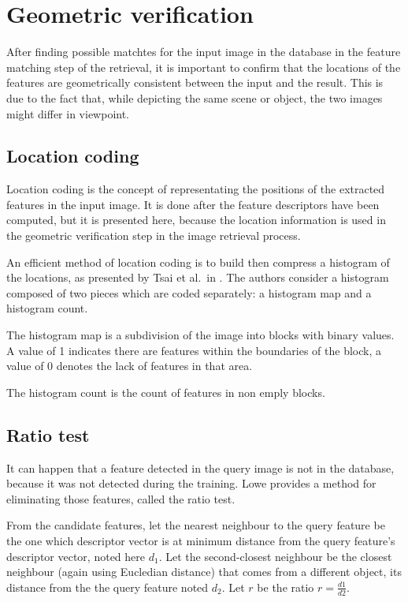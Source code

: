 \section{Geometric verification}
\label{sec:geometric_verification}

After finding possible matchtes for the input image in the database in the feature matching step of the retrieval, it is important to confirm that the locations of the features are geometrically consistent between the input and the result. This is due to the fact that, while depicting the same scene or object, the two images might differ in viewpoint.

\subsection{Location coding}

Location coding is the concept of representating the positions of the extracted features in the input image. It is done after the feature descriptors have been computed, but it is presented here, because the location information is used in the geometric verification step in the image retrieval process.

An efficient method of location coding is to build then compress a histogram of the locations, as presented by Tsai et al.\ in \cite{tsai2010fast}. The authors consider a histogram composed of two pieces which are coded separately: a histogram map and a histogram count.

The histogram map is a subdivision of the image into blocks with binary values. A value of 1 indicates there are features within the boundaries of the block, a value of 0 denotes the lack of features in that area.

The histogram count is the count of features in non emply blocks.

\subsection{Ratio test}

It can happen that a feature detected in the query image is not in the database, because it was not detected during the training. Lowe \cite{Lowe04distinctiveimage} provides a method for eliminating those features, called the ratio test.

From the candidate features, let the nearest neighbour to the query feature be the one which descriptor vector is at minimum distance from the query feature's descriptor vector, noted here $d_1$. Let the second-closest neighbour be the closest neighbour (again using Eucledian distance) that comes from a different object, its distance from the the query feature noted $d_2$. Let $r$ be the ratio $r = \frac{d1}{d2}$.

